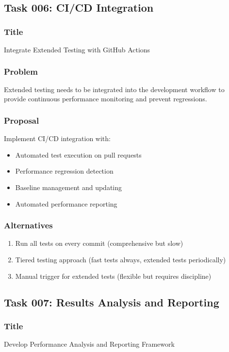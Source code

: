 \documentclass[11pt,a4paper]{article}
\begin{document}
\subsection{Task 006: CI/CD Integration}

\subsubsection{Title}
Integrate Extended Testing with GitHub Actions

\subsubsection{Problem}
Extended testing needs to be integrated into the development workflow to provide continuous performance monitoring and prevent regressions.

\subsubsection{Proposal}
Implement CI/CD integration with:
\begin{itemize}
    \item Automated test execution on pull requests
    \item Performance regression detection
    \item Baseline management and updating
    \item Automated performance reporting
\end{itemize}

\subsubsection{Alternatives}
\begin{enumerate}
    \item Run all tests on every commit (comprehensive but slow)
    \item Tiered testing approach (fast tests always, extended tests periodically)
    \item Manual trigger for extended tests (flexible but requires discipline)
\end{enumerate}

\subsection{Task 007: Results Analysis and Reporting}

\subsubsection{Title}
Develop Performance Analysis and Reporting Framework
\end{document}
